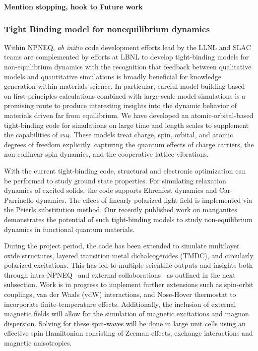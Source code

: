 \textbf{Mention stopping, hook to Future work}

\subsubsection{Tight Binding model for nonequilibrium dynamics}\label{sec:tight-binding}

Within NPNEQ, \emph{ab initio} code development efforts lead by the LLNL and SLAC teams are complemented by efforts at LBNL to develop tight-binding models for non-equilibrium dynamics with the recognition that feedback between qualitative models and quantitative simulations is broadly beneficial for knowledge generation within materials science. 
In particular, careful model building based on first-principles calculations combined with large-scale model simulations is a promising route to produce interesting insights into the dynamic behavior of  materials driven far from equilibrium. 
We have developed an atomic-orbital-based tight-binding code for simulations on large time and length scales to supplement the capabilities of \textsc{inq}. 
These models treat charge, spin, orbital, and atomic degrees of freedom explicitly, capturing the quantum effects of charge carriers, the non-collinear spin dynamics, and the cooperative lattice vibrations. 

With the current tight-binding code, structural and electronic optimization can be performed to study ground state properties. 
For simulating relaxation dynamics of excited solids, the code supports Ehrenfest dynamics and Car-Parrinello dynamics. 
The effect of linearly polarized light field is implemented via the Peierls substitution method. 
Our recently published work on manganites~\cite{Rajpurohit2021} demonstrates the potential of such tight-binding models to study non-equilibrium dynamics in functional quantum materials. 

During the project period, the code has been extended to simulate multilayer oxide structures, layered transition metal dichalcogenides (TMDC), and circularly polarized excitations. 
This has led to multiple scientific outputs and insights both through intra-NPNEQ~\cite{Rajpurohit2021} and external collaborations~\cite{Siddiqui2020} as outlined in the next subsection. 
Work is in progress to implement further extensions such as spin-orbit couplings, van der Waals (vdW) interactions, and Nose-Hover thermostat to incorporate finite-temperature effects. 
Additionally, the inclusion of external magnetic fields will allow for the simulation of magnetic excitations and magnon dispersion. 
Solving for these spin-waves will be done in large unit cells using an effective spin Hamiltonian consisting of Zeeman effects, exchange interactions and magnetic
anisotropies. 

